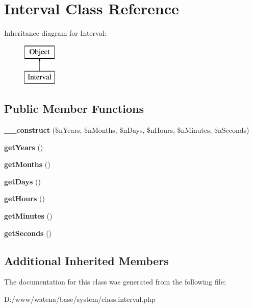 \hypertarget{class_interval}{\section{Interval Class Reference}
\label{class_interval}
}
Inheritance diagram for Interval\-:\begin{figure}[H]
\begin{center}
\leavevmode
\includegraphics[height=2.000000cm]{class_interval}
\end{center}
\end{figure}
\subsection*{Public Member Functions}
\begin{DoxyCompactItemize}
\item 
\hypertarget{class_interval_aedb1a45f581b5c1d6123f167f2bcfe90}{{\bfseries \-\_\-\-\_\-construct} (\$n\-Years, \$n\-Months, \$n\-Days, \$n\-Hours, \$n\-Minutes, \$n\-Seconds)}\label{class_interval_aedb1a45f581b5c1d6123f167f2bcfe90}

\item 
\hypertarget{class_interval_a894a8594c5d121c796c7433701ae78f9}{{\bfseries get\-Years} ()}\label{class_interval_a894a8594c5d121c796c7433701ae78f9}

\item 
\hypertarget{class_interval_a702d01ab852d46f544ca09cd642e466a}{{\bfseries get\-Months} ()}\label{class_interval_a702d01ab852d46f544ca09cd642e466a}

\item 
\hypertarget{class_interval_a8a9e01e724e4359693bf3233c234a781}{{\bfseries get\-Days} ()}\label{class_interval_a8a9e01e724e4359693bf3233c234a781}

\item 
\hypertarget{class_interval_ade050d7ab53465af2faf332f034bfc0a}{{\bfseries get\-Hours} ()}\label{class_interval_ade050d7ab53465af2faf332f034bfc0a}

\item 
\hypertarget{class_interval_a412f8b5a3251999e3327617598d4ac6f}{{\bfseries get\-Minutes} ()}\label{class_interval_a412f8b5a3251999e3327617598d4ac6f}

\item 
\hypertarget{class_interval_aa38e28dc4b78a311ea3e64718900880a}{{\bfseries get\-Seconds} ()}\label{class_interval_aa38e28dc4b78a311ea3e64718900880a}

\end{DoxyCompactItemize}
\subsection*{Additional Inherited Members}


The documentation for this class was generated from the following file\-:\begin{DoxyCompactItemize}
\item 
D\-:/www/watena/base/system/class.\-interval.\-php\end{DoxyCompactItemize}
